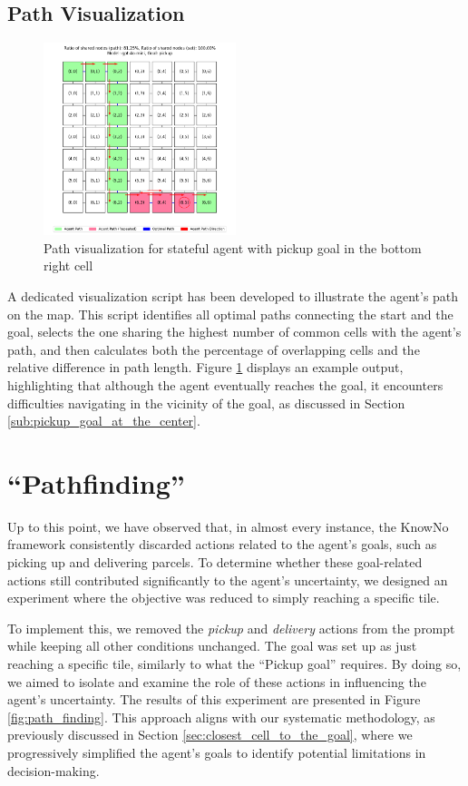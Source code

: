 \subsection{Path Visualization}

\begin{figure}[ht]
  \centering
  \includegraphics[width=0.5\textwidth]{
    images/results_discussion/stateful/pickupBR_7x7.png
  }
  \caption{Path visualization for stateful agent with pickup goal in the bottom
  right cell}
  \label{fig:stateful_path}
\end{figure}

A dedicated visualization script has been developed to illustrate the agent's
path on the map. This script identifies all optimal paths connecting the start and
the goal, selects the one sharing the highest number of common cells with the
agent's path, and then calculates both the percentage of overlapping cells and the
relative difference in path length. Figure \ref{fig:stateful_path} displays an
example output, highlighting that although the agent eventually reaches the goal,
it encounters difficulties navigating in the vicinity of the goal, as discussed in
Section \ref{sub:pickup_goal_at_the_center}.

\section{``Pathfinding''}

Up to this point, we have observed that, in almost every instance, the KnowNo framework
consistently discarded actions related to the agent's goals, such as picking up
and delivering parcels. To determine whether these goal-related actions still contributed
significantly to the agent's uncertainty, we designed an experiment where the
objective was reduced to simply reaching a specific tile.

To implement this, we removed the \emph{pickup} and \emph{delivery} actions from
the prompt while keeping all other conditions unchanged. The goal was set up as
just reaching a specific tile, similarly to what the ``Pickup goal'' requires.
By doing so, we aimed to isolate and examine the role of these actions in influencing
the agent's uncertainty. The results of this experiment are presented in Figure
\ref{fig:path_finding}. This approach aligns with our systematic methodology, as
previously discussed in Section \ref{sec:closest_cell_to_the_goal}, where we progressively
simplified the agent's goals to identify potential limitations in decision-making.

